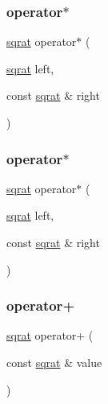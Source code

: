\mbox{\label{classsqrat_a0f75e7f8b43c76214b0845eadbfbfe6b}} 
\subsubsection{\texorpdfstring{operator$\ast$}{operator*}\hspace{0.1cm}{\footnotesize\ttfamily [1/2]}}
{\footnotesize\ttfamily \mbox{\hyperlink{classsqrat}{sqrat}} operator$\ast$ (\begin{DoxyParamCaption}\item[{\mbox{\hyperlink{classsqrat}{sqrat}}}]{left,  }\item[{const \mbox{\hyperlink{classsqrat}{sqrat}} \&}]{right }\end{DoxyParamCaption})\hspace{0.3cm}{\ttfamily [friend]}}

\mbox{\label{classsqrat_a0f75e7f8b43c76214b0845eadbfbfe6b}} 
\subsubsection{\texorpdfstring{operator$\ast$}{operator*}\hspace{0.1cm}{\footnotesize\ttfamily [2/2]}}
{\footnotesize\ttfamily \mbox{\hyperlink{classsqrat}{sqrat}} operator$\ast$ (\begin{DoxyParamCaption}\item[{\mbox{\hyperlink{classsqrat}{sqrat}}}]{left,  }\item[{const \mbox{\hyperlink{classsqrat}{sqrat}} \&}]{right }\end{DoxyParamCaption})\hspace{0.3cm}{\ttfamily [friend]}}

\mbox{\label{classsqrat_a5a4ae2683cd1f23c81c09229d1dcc34a}} 
\subsubsection{\texorpdfstring{operator+}{operator+}\hspace{0.1cm}{\footnotesize\ttfamily [1/4]}}
{\footnotesize\ttfamily \mbox{\hyperlink{classsqrat}{sqrat}} operator+ (\begin{DoxyParamCaption}\item[{const \mbox{\hyperlink{classsqrat}{sqrat}} \&}]{value }\end{DoxyParamCaption})\hspace{0.3cm}{\ttfamily [friend]}}

